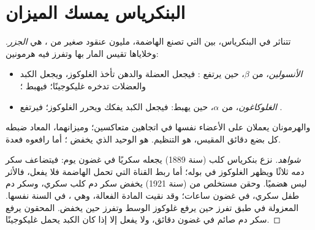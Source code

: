\section{البنكرياس يمسك الميزان}

\begin{proposition}\label{prop:g12:glucose-and-diabetes:hormones}
تتناثر في البنكرياس، بين  التي تصنع  الهاضمة، مليون
عنقود صغير من ، هي \emph{الجزر}. وخلاياها
تقيس  المار بها وتفرز فيه هرمونين:
\begin{itemize}
  \item \emph{الأنسولين}، من  $\beta$، حين
        يرتفع : فيجعل  العضلة والدهن تأخذ الغلوكوز، ويجعل
        الكبد والعضلات تدخره غليكوجينًا؛ فيهبط ؛
  \item \emph{الغلوكاغون}، من  $\alpha$، حين
        يهبط: فيجعل الكبد يفكك  ويحرر الغلوكوز؛ فيرتفع .
\end{itemize}
والهرمونان يعملان على الأعضاء نفسها في اتجاهين متعاكسين؛ وميزانهما،
المعاد ضبطه كل بضع دقائق  المقيس، هو التنظيم.  هو
 الوحيد الذي يخفض ؛ أما رافعوه فعدة.
\end{proposition}
\begin{proof}[شواهد]
نزع بنكرياس كلب (سنة 1889) يجعله سكريًا في غضون يوم: فيتضاعف سكر دمه
ثلاثًا ويظهر الغلوكوز في بوله؛ أما ربط القناة التي تحمل 
الهاضمة فلا يفعل، فالأثر ليس هضميًا. وحقن مستخلص من  (سنة 1921)
يخفض سكر دم كلب سكري، وسكر دم طفل سكري، في غضون ساعات؛ وقد نقيت المادة
الفعالة، وهي ، في السنة نفسها.  المعزولة في طبق تفرز
 حين يرفع غلوكوز الوسط وتفرز  حين يخفض. 
المحقون يرفع سكر دم صائم في غضون دقائق، ولا يفعل إلا إذا كان الكبد
يحمل غليكوجينًا.
\end{proof}

